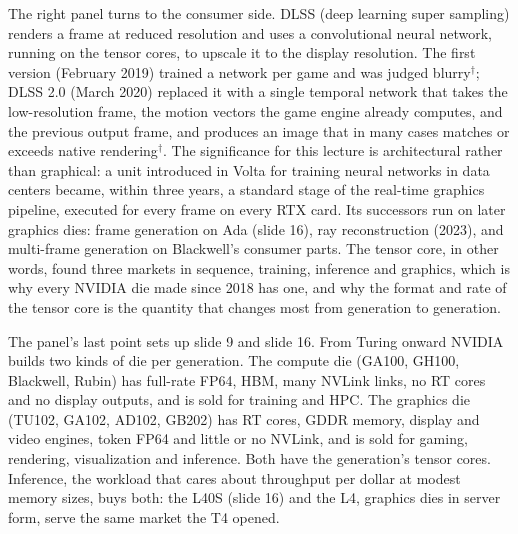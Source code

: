 \documentclass[11pt,letterpaper]{article}
\begin{document}
The right panel turns to the consumer side. DLSS (deep learning super sampling) renders a frame at reduced resolution and uses a convolutional neural network, running on the tensor cores, to upscale it to the display resolution. The first version (February 2019) trained a network per game and was judged blurry$^\dagger$; DLSS 2.0 (March 2020) replaced it with a single temporal network that takes the low-resolution frame, the motion vectors the game engine already computes, and the previous output frame, and produces an image that in many cases matches or exceeds native rendering$^\dagger$. The significance for this lecture is architectural rather than graphical: a unit introduced in Volta for training neural networks in data centers became, within three years, a standard stage of the real-time graphics pipeline, executed for every frame on every RTX card. Its successors run on later graphics dies: frame generation on Ada (slide 16), ray reconstruction (2023), and multi-frame generation on Blackwell's consumer parts. The tensor core, in other words, found three markets in sequence, training, inference and graphics, which is why every NVIDIA die made since 2018 has one, and why the format and rate of the tensor core is the quantity that changes most from generation to generation.

The panel's last point sets up slide 9 and slide 16. From Turing onward NVIDIA builds two kinds of die per generation. The compute die (GA100, GH100, Blackwell, Rubin) has full-rate FP64, HBM, many NVLink links, no RT cores and no display outputs, and is sold for training and HPC. The graphics die (TU102, GA102, AD102, GB202) has RT cores, GDDR memory, display and video engines, token FP64 and little or no NVLink, and is sold for gaming, rendering, visualization and inference. Both have the generation's tensor cores. Inference, the workload that cares about throughput per dollar at modest memory sizes, buys both: the L40S (slide 16) and the L4, graphics dies in server form, serve the same market the T4 opened.
\end{document}
